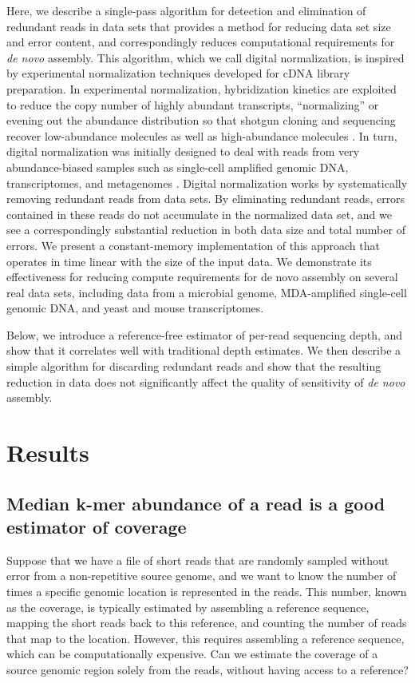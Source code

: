 \documentclass[10pt]{article}
\begin{document}
Here, we describe a single-pass algorithm for detection and
elimination of redundant reads in data sets that provides a method for
reducing data set size and error content, and correspondingly reduces
computational requirements for {\em de novo} assembly.  This algorithm,
which we call digital normalization, is inspired by experimental
normalization techniques developed for cDNA library preparation.  In
experimental normalization, hybridization kinetics are exploited to
reduce the copy number of highly abundant transcripts, ``normalizing''
or evening out the abundance distribution so that shotgun cloning and
sequencing recover low-abundance molecules as well as high-abundance
molecules \cite{pubmed8889548,pubmed7937745}.  In turn, digital
normalization was initially designed to deal with reads from very
abundance-biased samples such as single-cell amplified genomic DNA,
transcriptomes, and metagenomes \cite{pubmed16732271,pubmed19015660,pubmed16304596}.  Digital normalization works by
systematically removing redundant reads from data sets.  By
eliminating redundant reads, errors contained in these reads do not
accumulate in the normalized data set, and we see a correspondingly
substantial reduction in both data size and total number of errors.
We present a constant-memory implementation of this approach that
operates in time linear with the size of the input data.  We
demonstrate its effectiveness for reducing compute requirements for de
novo assembly on several real data sets, including data from a
microbial genome, MDA-amplified single-cell genomic DNA, and yeast and mouse
transcriptomes.

Below, we introduce a reference-free estimator of per-read sequencing
depth, and show that it correlates well with traditional depth estimates.
We then describe a simple algorithm for discarding redundant reads and
show that the resulting reduction in data does not significantly affect
the quality of sensitivity of {\em de novo} assembly.

\section*{Results}

\subsection*{Median k-mer abundance of a read is a good estimator of coverage}

Suppose that we have a file of short reads that are randomly sampled
without error from a non-repetitive source genome, and we want to know
the number of times a specific genomic location is represented in the
reads.  This number, known as the coverage, is typically estimated by
assembling a reference sequence, mapping the short reads back to this
reference, and counting the number of reads that map to the location.
However, this requires assembling a reference sequence, which can be
computationally expensive.  Can we estimate the coverage of a source
genomic region solely from the reads, without having access to a
reference?
\end{document}
